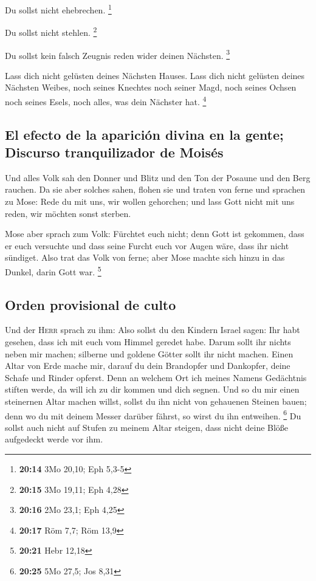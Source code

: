  Du sollst nicht ehebrechen. \footnote{\textbf{20:14} 3Mo
  20,10; Eph 5,3-5}

 Du sollst nicht stehlen. \footnote{\textbf{20:15} 3Mo
  19,11; Eph 4,28}

 Du sollst kein falsch Zeugnis reden wider deinen
Nächsten. \footnote{\textbf{20:16} 2Mo 23,1; Eph 4,25}

 Lass dich nicht gelüsten deines Nächsten Hauses. Lass
dich nicht gelüsten deines Nächsten Weibes, noch seines Knechtes noch
seiner Magd, noch seines Ochsen noch seines Esels, noch alles, was dein
Nächster hat. \footnote{\textbf{20:17} Röm 7,7; Röm 13,9}

\hypertarget{el-efecto-de-la-apariciuxf3n-divina-en-la-gente-discurso-tranquilizador-de-moisuxe9s}{%
\subsection{El efecto de la aparición divina en la gente; Discurso
tranquilizador de
Moisés}\label{el-efecto-de-la-apariciuxf3n-divina-en-la-gente-discurso-tranquilizador-de-moisuxe9s}}

 Und alles Volk sah den Donner und Blitz und den Ton der
Posaune und den Berg rauchen. Da sie aber solches sahen, flohen sie und
traten von ferne  und sprachen zu Mose: Rede du mit uns,
wir wollen gehorchen; und lass Gott nicht mit uns reden, wir möchten
sonst sterben.

 Mose aber sprach zum Volk: Fürchtet euch nicht; denn
Gott ist gekommen, dass er euch versuchte und dass seine Furcht euch vor
Augen wäre, dass ihr nicht sündiget.  Also trat das Volk
von ferne; aber Mose machte sich hinzu in das Dunkel, darin Gott war.
\footnote{\textbf{20:21} Hebr 12,18}

\hypertarget{orden-provisional-de-culto}{%
\subsection{Orden provisional de
culto}\label{orden-provisional-de-culto}}

 Und der \textsc{Herr} sprach zu ihm: Also sollst du den
Kindern Israel sagen: Ihr habt gesehen, dass ich mit euch vom Himmel
geredet habe.  Darum sollt ihr nichts neben mir machen;
silberne und goldene Götter sollt ihr nicht machen. 
Einen Altar von Erde mache mir, darauf du dein Brandopfer und Dankopfer,
deine Schafe und Rinder opferst. Denn an welchem Ort ich meines Namens
Gedächtnis stiften werde, da will ich zu dir kommen und dich segnen.
 Und so du mir einen steinernen Altar machen willst,
sollst du ihn nicht von gehauenen Steinen bauen; denn wo du mit deinem
Messer darüber fährst, so wirst du ihn entweihen. \footnote{\textbf{20:25}
  5Mo 27,5; Jos 8,31}  Du sollst auch nicht auf Stufen zu
meinem Altar steigen, dass nicht deine Blöße aufgedeckt werde vor ihm.


